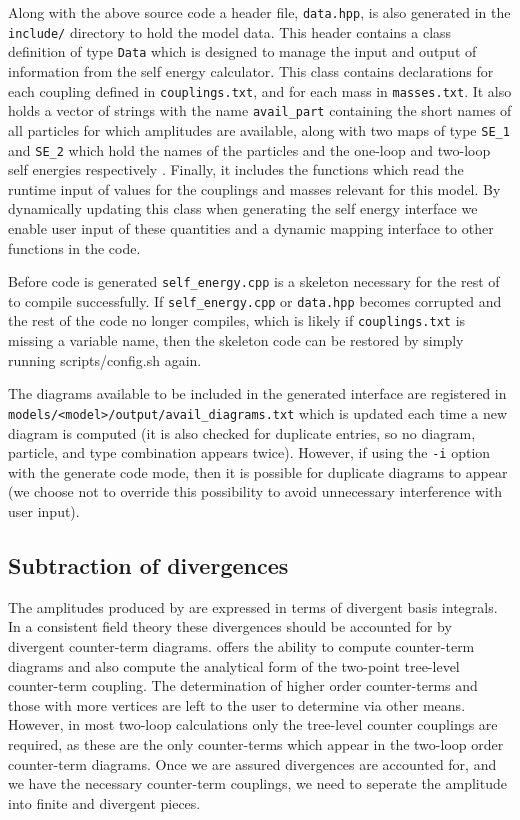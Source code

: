 Along with the above source code a header file, \lstinline{data.hpp}, is also generated in the \lstinline{include/} directory to hold the model data.  This header contains a class definition of type \lstinline{Data} which is designed to manage the input and output of information from the self energy calculator.   This class contains declarations for each coupling defined in \lstinline{couplings.txt}, and for each mass in \lstinline{masses.txt}.  It also holds a vector of strings with the name \lstinline{avail_part} containing the short names of all particles for which amplitudes are available, along with two maps of type  \lstinline{SE_1} and \lstinline{SE_2} which hold the names of the particles and the one-loop and two-loop self energies respectively .  Finally, it includes the functions which read the runtime input of values for the couplings and masses relevant for this model.  By dynamically updating this class when generating the self energy interface we enable user input of these quantities and a dynamic mapping interface to other functions in the code.

Before code is generated \lstinline{self_energy.cpp} is a skeleton necessary for the rest of \mb to compile successfully.  If \lstinline{self_energy.cpp} or \lstinline{data.hpp} becomes corrupted and the rest of the code no longer compiles, which is likely if \lstinline{couplings.txt} is missing a variable name, then the skeleton code can be restored by simply running scripts/config.sh again.

The diagrams available to be included in the generated \tsil interface are registered in \lstinline{models/<model>/output/avail_diagrams.txt} which is updated each time a new diagram is computed (it is also checked for duplicate entries, so no diagram, particle, and type combination appears twice).  However, if using the \lstinline{-i} option with the generate code mode, then it is possible for duplicate diagrams to appear (we choose not to override this possibility to avoid unnecessary interference with user input).

\subsection{Subtraction of divergences}\label{sec:divergences}

The amplitudes produced by \tarcer are expressed in terms of divergent basis integrals.  In a consistent field theory these divergences should be accounted for by divergent counter-term diagrams.  \mb offers the ability to compute counter-term diagrams and also compute the analytical form of the two-point tree-level counter-term coupling.  The determination of higher order counter-terms and those with more vertices are left to the user to determine via other means.  However, in most two-loop calculations only the tree-level counter couplings are required, as these are the only counter-terms which appear in the two-loop order counter-term diagrams.  Once we are assured divergences are accounted for, and we have the necessary counter-term couplings, we need to seperate the amplitude into finite and divergent pieces.

